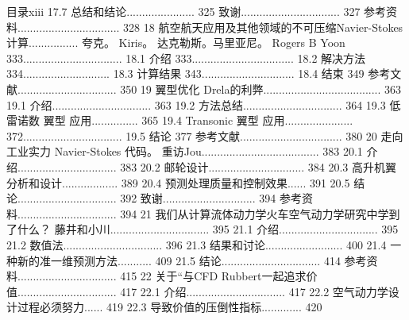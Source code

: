 \documentclass[UTF8,11pt,a4paper,openany,fontset=fandol]{ctexbook}
\begin{document}
目录xiii 17.7 总结和结论...................... 325 致谢................................ 327 参考资料................................. 328 18 航空航天应用及其他领域的不可压缩Navier-Stokes计算................ 夸克。 Kiris。 达克勒斯。马里亚尼。 Rogers B Yoon 333................................ 18.1 介绍 333................................. 18.2 解决方法 334............................ 18.3 计算结果 343.............................. 18.4 结束 349 参考文献................................ 350 19 翼型优化 Drela的利弊...................................... 363 19.1 介绍................................ 363 19.2 方法总结................................ 364 19.3 低 雷诺数 翼型 应用............... 365 19.4 Transonic 翼型 应用...................... 372................................ 19.5 结论 377 参考文献................................. 380 20 走向工业实力 Navier-Stokes 代码。 重访Jou...................................... 383 20.1 介绍................................ 383 20.2 邮轮设计............................... 384 20.3 高升机翼分析和设计.................. 389 20.4 预测处理质量和控制效果...... 391 20.5 结论................................ 392 致谢.............................. 394 参考资料................................ 394 21 我们从计算流体动力学火车空气动力学研究中学到了什么？ 藤井和小川................................ 395 21.1 介绍................................ 395 21.2 数值法................................ 396 21.3 结果和讨论......................... 400 21.4 一种新的准一维预测方法........... 409 21.5 结论................................ 414 参考资料................................ 415 22 关于“与CFD Rubbert一起追求价值................................ 417 22.1 介绍................................ 417 22.2 空气动力学设计过程必须努力...... 419 22.3 导致价值的压倒性指标............. 420
\end{document}

